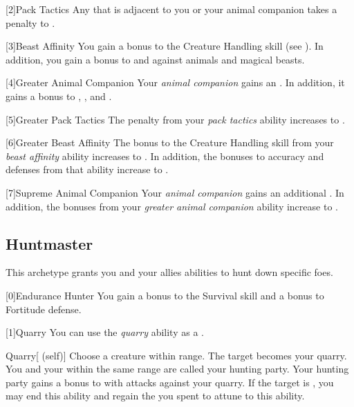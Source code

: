         [2]{Pack Tactics} Any   that is adjacent to you or your animal companion takes a  penalty to .

        [3]{Beast Affinity} You gain a  bonus to the Creature Handling skill (see ).
        In addition, you gain a  bonus to  and  against animals and magical beasts.

        [4]{Greater Animal Companion} Your \textit{animal companion} gains an .
        In addition, it gains a  bonus to , , and .

        [5]{Greater Pack Tactics} The penalty from your \textit{pack tactics} ability increases to .

        [6]{Greater Beast Affinity} The bonus to the Creature Handling skill from your \textit{beast affinity} ability increases to .
        In addition, the bonuses to accuracy and defenses from that ability increase to .

        [7]{Supreme Animal Companion} Your \textit{animal companion} gains an additional .
        In addition, the bonuses from your \textit{greater animal companion} ability increase to .

    \newpage
    \subsection{Huntmaster}
        This archetype grants you and your allies abilities to hunt down specific foes.

        [0]{Endurance Hunter} You gain a  bonus to the Survival skill and a  bonus to Fortitude defense.

        [1]{Quarry}\label{Quarry} You can use the \textit{quarry} ability as a .
        \begin{attuneability}{Quarry}[ (self)]
            Choose a creature within \rnglong range.
            The target becomes your quarry.
            You and your  within the same range are called your hunting party.
            Your hunting party gains a  bonus to  with  attacks against your quarry.
            If the target is , you may end this ability and regain the  you spent to attune to this ability.
        \end{attuneability}

